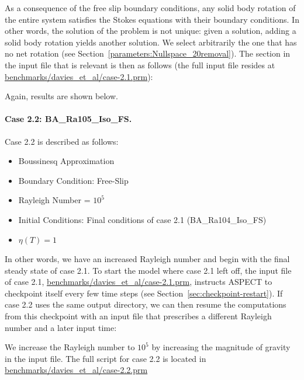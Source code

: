 \documentclass{article}
\newcommand{\aspect}{\textsc{ASPECT}}
\begin{document}
As a consequence of the free slip boundary conditions, any solid body rotation
of the entire system satisfies the Stokes equations with their boundary
conditions. In other words, the solution of the problem is not unique: given a
solution, adding a solid body rotation yields another solution. We select
arbitrarily the one that has no net rotation (see
Section~\ref{parameters:Nullspace_20removal}). The section in the input file
that is relevant is then as follows (the full input file resides at
\url{benchmarks/davies_et_al/case-2.1.prm}):



Again, results are shown below.


\paragraph{Case 2.2: BA\_Ra105\_Iso\_FS.}
\label{sec:davies-case22_BA}

Case 2.2 is described as follows:
\begin{itemize}
\item Boussinesq Approximation
\item Boundary Condition: Free-Slip
\item Rayleigh Number = $10^5$
\item Initial Conditions: Final conditions of case 2.1 (BA\_Ra104\_Iso\_FS)
\item $\eta(T) = 1$
\end{itemize}
In other words, we have an increased Rayleigh number and begin with the final
steady state of case 2.1. To start the model where case 2.1 left off, the
input file of case 2.1, \url{benchmarks/davies_et_al/case-2.1.prm}, instructs
\aspect{} to checkpoint itself every few time steps (see
Section~\ref{sec:checkpoint-restart}). If case 2.2 uses the same
output directory, we can then resume the computations from this checkpoint with
an input file that prescribes a different Rayleigh number and a later input time:



We increase the Rayleigh number to $10^5$ by increasing the magnitude of
gravity in the input file.  The full script for case 2.2 is located in
\url{benchmarks/davies_et_al/case-2.2.prm}
\end{document}
